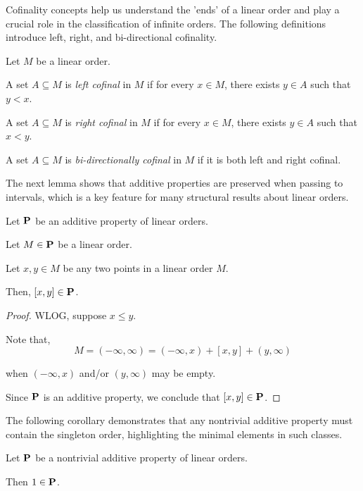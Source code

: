 Cofinality concepts help us understand the 'ends' of a linear order and play a crucial role in the classification of infinite
orders. The following definitions introduce left, right, and bi-directional cofinality.

\begin{definition}
  Let $M$ be a linear order.

  A set $A \subseteq M$ is \emph{left cofinal} in $M$ if for every $x \in M$,
  there exists $y \in A$ such that $y < x$.

  A set $A \subseteq M$ is \emph{right cofinal} in $M$ if for every $x \in M$,
  there exists $y \in A$ such that $x < y$.

  A set $A \subseteq M$ is \emph{bi-directionally cofinal} in $M$ if it is both left and right cofinal.
\end{definition}

The next lemma shows that additive properties are preserved when passing to intervals, which is a key feature for many
structural results about linear orders.
\begin{lemma}\label{additive-interval}
  Let $\mathbf{P}$ be an additive property of linear orders.

  Let $M \in \mathbf{P}$ be a linear order.

  Let $x, y \in M$ be any two points in a linear order $M$.

  Then, $[x, y] \in \mathbf{P}$.
\end{lemma}

\begin{proof}
  WLOG, suppose $x \le y$.

  Note that,
  \[
    M = (-\infty, \infty) = (-\infty, x) + [x, y] + (y, \infty)
  \]

  when $(-\infty, x)$ and/or $(y, \infty)$ may be empty.

  Since $\mathbf{P}$ is an additive property, we conclude that $[x, y] \in \mathbf{P}$.
\end{proof}

The following corollary demonstrates that any nontrivial additive property must contain the singleton order, highlighting the
minimal elements in such classes.

\begin{corollary}\label{additive-1}
  Let $\mathbf{P}$ be a nontrivial additive property of linear orders.

  Then $1 \in \mathbf{P}$.
\end{corollary}

